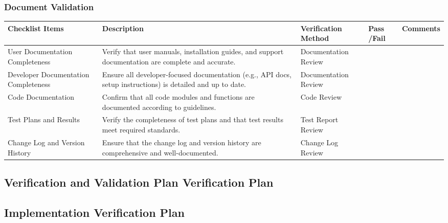 \documentclass[12pt, titlepage]{article}
\begin{document}
\newpage

\subsubsection{Document Validation}

\noindent \begin{tabular}{|>{\raggedright\arraybackslash}p{3cm}|>{\raggedright\arraybackslash}p{4cm}|>{\raggedright\arraybackslash}p{3cm}|p{1cm}|p{2.25cm}|}
	\hline
	\textbf{Checklist Items} & \textbf{Description} & \textbf{Verification Method} & \textbf{Pass /Fail} & \textbf{Comments} \\ 
	\hline
	User Documentation Completeness	& Verify that user manuals, installation guides, and support documentation are complete and accurate. & Documentation Review & & \\
	\hline
	Developer Documentation Completeness & Ensure all developer-focused documentation (e.g., API docs, setup instructions) is detailed and up to date. & Documentation Review & & \\ 
	\hline
	Code Documentation & Confirm that all code modules and functions are documented according to guidelines. & Code Review & & \\
	\hline
	Test Plans and Results & Verify the completeness of test plans and that test results meet required standards. & Test Report Review & & \\
	\hline
	Change Log and Version History & Ensure that the change log and version history are comprehensive and well-documented. & Change Log Review & & \\ 
	\hline
\end{tabular}

\subsection{Verification and Validation Plan Verification Plan}




\subsection{Implementation Verification Plan}
\end{document}
